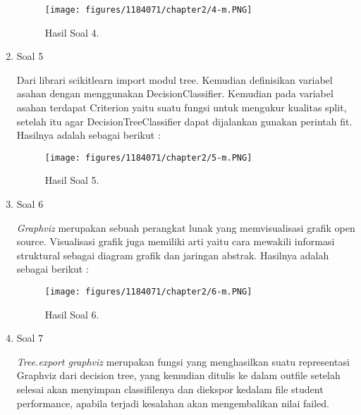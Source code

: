 \begin{enumerate}
	\begin{figure}[h]
	\centering
		\texttt{[image: figures/1184071/chapter2/4-m.PNG]}
		\caption{Hasil Soal 4.}
	\end{figure}
	\item Soal 5
	\hfill\break
	
	Dari librari scikitlearn import modul tree. Kemudian definisikan variabel asahan dengan menggunakan DecisionClassifier. Kemudian pada variabel asahan terdapat Criterion yaitu suatu fungsi untuk mengukur kualitas split, setelah itu agar DecisionTreeClassifier dapat dijalankan gunakan perintah fit. Hasilnya adalah sebagai berikut :
	\begin{figure}[h]
	\centering
		\texttt{[image: figures/1184071/chapter2/5-m.PNG]}
		\caption{Hasil Soal 5.}
	\end{figure}
\item Soal 6
	\hfill\break
	
	\textit{Graphviz} merupakan sebuah perangkat lunak yang memvisualisasi grafik open source. Visualisasi grafik juga memiliki arti yaitu cara mewakili informasi struktural sebagai diagram grafik dan jaringan abstrak. Hasilnya adalah sebagai berikut :
	\begin{figure}[h]
	\centering
		\texttt{[image: figures/1184071/chapter2/6-m.PNG]}
		\caption{Hasil Soal 6.}
	\end{figure}
	\item Soal 7
	\hfill\break
	
	\textit{Tree.export graphviz} merupakan fungsi yang menghasilkan suatu representasi Graphviz dari decision tree, yang kemudian ditulis ke dalam outfile setelah selesai akan menyimpan classifilenya dan diekspor kedalam file student performance, apabila terjadi kesalahan akan mengembalikan nilai failed. 


\end{enumerate}
